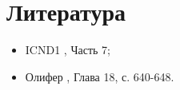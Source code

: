 \section{Литература}
\begin{itemize}
	\item ICND1 \cite{icnd1eng}, Часть 7;
	\item Олифер \cite{olipher}, Глава 18, с. 640-648.
\end{itemize}